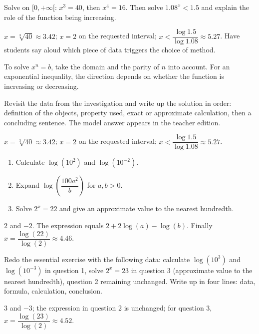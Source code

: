 \begin{activity}
Solve on $[0,+\infty[$: $x^3=40$, then $x^4=16$. Then solve $\num{1,08}^x<\num{1,5}$ and explain the role of the function being increasing.

\end{activity}
\begin{solution}$x=\sqrt[3]{40}\approx\num{3,42}$; $x=2$ on the requested interval; $x<\dfrac{\log\num{1,5}}{\log\num{1,08}}\approx\num{5,27}$. Have students say aloud which piece of data triggers the choice of method.\end{solution}

\begin{summary}To solve $x^n=b$, take the domain and the parity of $n$ into account. For an exponential inequality, the direction depends on whether the function is increasing or decreasing.\end{summary}

\begin{example}
Revisit the data from the investigation and write up the solution in order: definition of the objects, property used, exact or approximate calculation, then a concluding sentence. The model answer appears in the teacher edition.
\end{example}
\begin{solution}$x=\sqrt[3]{40}\approx\num{3,42}$; $x=2$ on the requested interval; $x<\dfrac{\log\num{1,5}}{\log\num{1,08}}\approx\num{5,27}$.\end{solution}

\begin{exercise}[essential]
\begin{enumerate}\item Calculate $\log(10^2)$ and $\log(10^{-2})$.\item Expand $\log\!\left(\dfrac{100a^2}{b}\right)$ for $a,b>0$.\item Solve $2^x=22$ and give an approximate value to the nearest hundredth.\end{enumerate}
\end{exercise}
\begin{solution}$2$ and $-2$. The expression equals $2+2\log(a)-\log(b)$. Finally $x=\dfrac{\log(22)}{\log(2)}\approx\num{4,46}$.\end{solution}


\begin{homework}Redo the essential exercise with the following data: calculate $\log(10^{3})$ and $\log(10^{-3})$ in question 1, solve $2^x=23$ in question 3 (approximate value to the nearest hundredth), question 2 remaining unchanged. Write up in four lines: data, formula, calculation, conclusion.\end{homework}
\begin{solution}$3$ and $-3$; the expression in question 2 is unchanged; for question 3, $x=\dfrac{\log(23)}{\log(2)}\approx\num{4,52}$.\end{solution}

